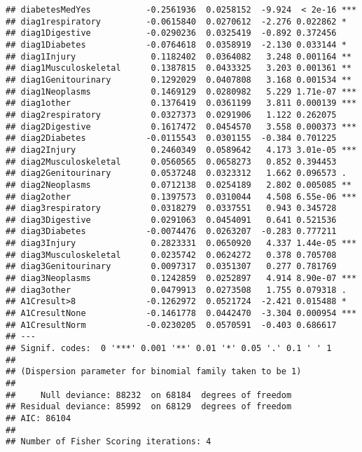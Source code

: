 \documentclass[]{article}
\newenvironment{Shaded}{\begin{snugshade}}{\end{snugshade}}
\newcommand{\KeywordTok}[1]{\textcolor[rgb]{0.13,0.29,0.53}{\textbf{#1}}}
\newcommand{\DataTypeTok}[1]{\textcolor[rgb]{0.13,0.29,0.53}{#1}}
\newcommand{\DecValTok}[1]{\textcolor[rgb]{0.00,0.00,0.81}{#1}}
\newcommand{\FloatTok}[1]{\textcolor[rgb]{0.00,0.00,0.81}{#1}}
\newcommand{\StringTok}[1]{\textcolor[rgb]{0.31,0.60,0.02}{#1}}
\newcommand{\CommentTok}[1]{\textcolor[rgb]{0.56,0.35,0.01}{\textit{#1}}}
\newcommand{\OperatorTok}[1]{\textcolor[rgb]{0.81,0.36,0.00}{\textbf{#1}}}
\newcommand{\NormalTok}[1]{#1}
\begin{document}
\begin{verbatim}
## diabetesMedYes           -0.2561936  0.0258152  -9.924  < 2e-16 ***
## diag1respiratory         -0.0615840  0.0270612  -2.276 0.022862 *  
## diag1Digestive           -0.0290236  0.0325419  -0.892 0.372456    
## diag1Diabetes            -0.0764618  0.0358919  -2.130 0.033144 *  
## diag1Injury               0.1182402  0.0364082   3.248 0.001164 ** 
## diag1Musculoskeletal      0.1387815  0.0433325   3.203 0.001361 ** 
## diag1Genitourinary        0.1292029  0.0407808   3.168 0.001534 ** 
## diag1Neoplasms            0.1469129  0.0280982   5.229 1.71e-07 ***
## diag1other                0.1376419  0.0361199   3.811 0.000139 ***
## diag2respiratory          0.0327373  0.0291906   1.122 0.262075    
## diag2Digestive            0.1617472  0.0454570   3.558 0.000373 ***
## diag2Diabetes            -0.0115543  0.0301155  -0.384 0.701225    
## diag2Injury               0.2460349  0.0589642   4.173 3.01e-05 ***
## diag2Musculoskeletal      0.0560565  0.0658273   0.852 0.394453    
## diag2Genitourinary        0.0537248  0.0323312   1.662 0.096573 .  
## diag2Neoplasms            0.0712138  0.0254189   2.802 0.005085 ** 
## diag2other                0.1397573  0.0310044   4.508 6.55e-06 ***
## diag3respiratory          0.0318279  0.0337551   0.943 0.345728    
## diag3Digestive            0.0291063  0.0454091   0.641 0.521536    
## diag3Diabetes            -0.0074476  0.0263207  -0.283 0.777211    
## diag3Injury               0.2823331  0.0650920   4.337 1.44e-05 ***
## diag3Musculoskeletal      0.0235742  0.0624272   0.378 0.705708    
## diag3Genitourinary        0.0097317  0.0351307   0.277 0.781769    
## diag3Neoplasms            0.1242859  0.0252897   4.914 8.90e-07 ***
## diag3other                0.0479913  0.0273508   1.755 0.079318 .  
## A1Cresult>8              -0.1262972  0.0521724  -2.421 0.015488 *  
## A1CresultNone            -0.1461778  0.0442470  -3.304 0.000954 ***
## A1CresultNorm            -0.0230205  0.0570591  -0.403 0.686617    
## ---
## Signif. codes:  0 '***' 0.001 '**' 0.01 '*' 0.05 '.' 0.1 ' ' 1
## 
## (Dispersion parameter for binomial family taken to be 1)
## 
##     Null deviance: 88232  on 68184  degrees of freedom
## Residual deviance: 85992  on 68129  degrees of freedom
## AIC: 86104
## 
## Number of Fisher Scoring iterations: 4
\end{verbatim}

\begin{Shaded}
\end{Shaded}
\end{document}
